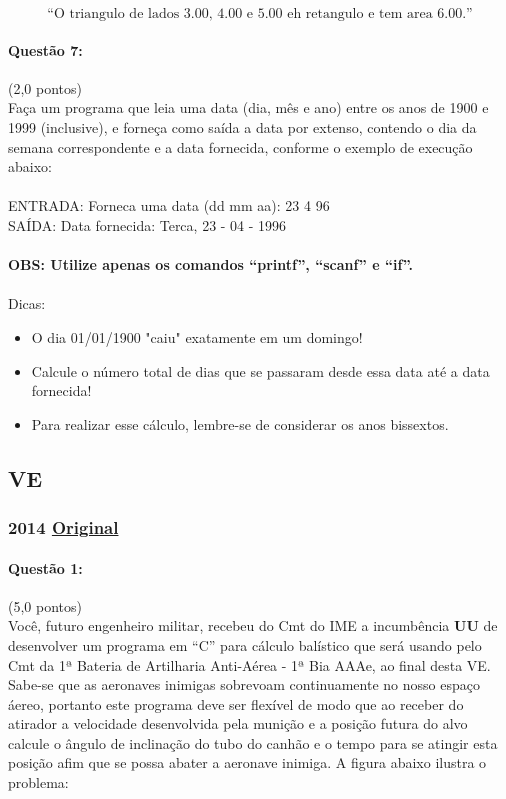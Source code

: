 \documentclass[12pt,a4paper]{article}
\newcommand{\original}[1]{\tiny \href{#1}{Original} \normalsize}
\begin{document}
$$\text{“O triangulo de lados 3.00, 4.00 e 5.00 eh retangulo e tem area 6.00.”}$$

\paragraph{Questão 7:}(2,0 pontos)\\
Faça um programa que leia uma data (dia, mês e ano) entre os anos de 1900 e 1999 (inclusive), e forneça como saída a data por extenso, contendo o dia da semana correspondente e a data fornecida, conforme o exemplo de execução abaixo:
\\
\\ENTRADA:       Forneca uma data (dd mm aa): 23 4 96\\
SAÍDA:              Data fornecida: Terca, 23 - 04 - 1996
\\
\\
\textbf{OBS: Utilize apenas os comandos “printf”, “scanf” e “if”.}
\\
\\Dicas:
\begin{itemize}
\item O dia 01/01/1900 "caiu" exatamente em um domingo! 
\item Calcule o número total de dias que se passaram desde essa data até a data fornecida! 
\item Para realizar esse cálculo, lembre-se de considerar os anos bissextos. 
\end{itemize}

\newpage


\subsection{VE}

\subsubsection{2014 \original{https://drive.google.com/file/d/1tsuTm669zW9XvWFLxBP6JY1pdDvHgpvz/view?usp=sharing}}



\paragraph{Questão 1:}(5,0 pontos)\\
Você, futuro engenheiro militar, recebeu do Cmt do IME a incumbência \textbf{UU} de desenvolver um programa em “C” para cálculo balístico que será usando pelo Cmt da 1ª Bateria de Artilharia Anti-Aérea - 1ª Bia AAAe, ao final desta VE.\\
 Sabe-se que as aeronaves inimigas sobrevoam continuamente no nosso espaço áereo, portanto este programa deve ser flexível de modo que ao receber do atirador a velocidade desenvolvida pela munição e a posição futura do alvo calcule o ângulo de inclinação do tubo do canhão e o tempo para se atingir esta posição afim que se possa abater a aeronave inimiga. A figura abaixo ilustra o problema: 
\end{document}
